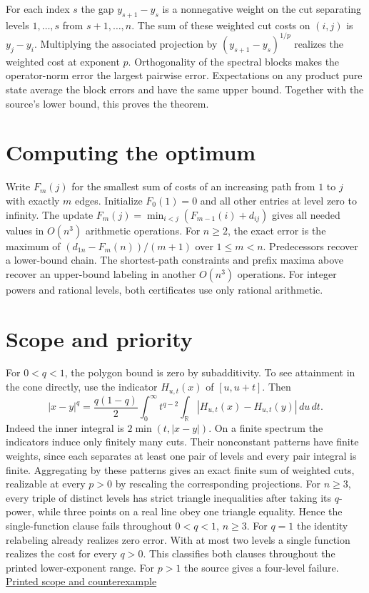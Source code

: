 \documentclass[11pt]{article}
\begin{document}
For each index $s$ the gap $y_{s+1}-y_s$ is a nonnegative weight on the cut separating levels $1,\dots,s$ from $s+1,\dots,n$. The sum of these weighted cut costs on $(i,j)$ is $y_j-y_i$. Multiplying the associated projection by $(y_{s+1}-y_s)^{1/p}$ realizes the weighted cost at exponent $p$. Orthogonality of the spectral blocks makes the operator-norm error the largest pairwise error. Expectations on any product pure state average the block errors and have the same upper bound. Together with the source's lower bound, this proves the theorem.

\section{Computing the optimum}

Write $F_m(j)$ for the smallest sum of costs of an increasing path from $1$ to $j$ with exactly $m$ edges. Initialize $F_0(1)=0$ and all other entries at level zero to infinity. The update $F_m(j)=\min_{i<j}(F_{m-1}(i)+d_{ij})$ gives all needed values in $O(n^3)$ arithmetic operations. For $n\ge2$, the exact error is the maximum of $(d_{1n}-F_m(n))/(m+1)$ over $1\le m<n$. Predecessors recover a lower-bound chain. The shortest-path constraints and prefix maxima above recover an upper-bound labeling in another $O(n^3)$ operations. For integer powers and rational levels, both certificates use only rational arithmetic.

\section{Scope and priority}

For $0<q<1$, the polygon bound is zero by subadditivity. To see attainment in the cone directly, use the indicator $H_{u,t}(x)$ of $[u,u+t]$. Then
\[
 |x-y|^q=\frac{q(1-q)}{2}\int_0^\infty t^{q-2}\int_{\mathbb R}
 |H_{u,t}(x)-H_{u,t}(y)|\,du\,dt .
\]
Indeed the inner integral is $2\min(t,|x-y|)$. On a finite spectrum the indicators induce only finitely many cuts. Their nonconstant patterns have finite weights, since each separates at least one pair of levels and every pair integral is finite. Aggregating by these patterns gives an exact finite sum of weighted cuts, realizable at every $p>0$ by rescaling the corresponding projections. For $n\ge3$, every triple of distinct levels has strict triangle inequalities after taking its $q$-power, while three points on a real line obey one triangle equality. Hence the single-function clause fails throughout $0<q<1$, $n\ge3$. For $q=1$ the identity relabeling already realizes zero error. With at most two levels a single function realizes the cost for every $q>0$. This classifies both clauses throughout the printed lower-exponent range. For $p>1$ the source gives a four-level failure. \href{https://github.com/ipitchford/quantum-transport-cost-cones/blob/270f5dba795ffd73d271bfde959237b730227c5e/manuscript.tex\#L535-L563}{Printed scope and counterexample}
\end{document}
